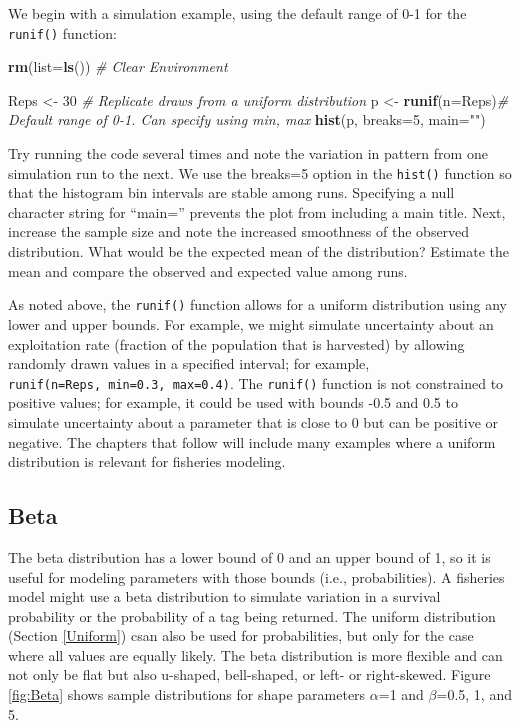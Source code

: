 \documentclass[
]{krantz}
\makeatletter
\newenvironment{Shaded}{\begin{snugshade}}{\end{snugshade}}
\newcommand{\AttributeTok}[1]{\textcolor[rgb]{0.27,0.27,0.27}{#1}}
\newcommand{\CommentTok}[1]{\textcolor[rgb]{0.37,0.37,0.37}{\textit{#1}}}
\newcommand{\DecValTok}[1]{\textcolor[rgb]{0.06,0.06,0.06}{#1}}
\newcommand{\FunctionTok}[1]{\textcolor[rgb]{0.27,0.27,0.27}{\textbf{#1}}}
\newcommand{\NormalTok}[1]{#1}
\newcommand{\OtherTok}[1]{\textcolor[rgb]{0.37,0.37,0.37}{#1}}
\newcommand{\StringTok}[1]{\textcolor[rgb]{0.5,0.5,0.5}{#1}}
\newenvironment{kframe}{%
\medskip{}
\setlength{\fboxsep}{.8em}
 \def\at@end@of@kframe{}%
 \ifinner\ifhmode%
  \def\at@end@of@kframe{\end{minipage}}%
  \begin{minipage}{\columnwidth}%
 \fi\fi%
 \def\FrameCommand##1{\hskip\@totalleftmargin \hskip-\fboxsep
 \colorbox{shadecolor}{##1}\hskip-\fboxsep
     \hskip-\linewidth \hskip-\@totalleftmargin \hskip\columnwidth}%
 \MakeFramed {\advance\hsize-\width
   \@totalleftmargin\z@ \linewidth\hsize
   \@setminipage}}%
 {\par\unskip\endMakeFramed%
 \at@end@of@kframe}
\renewenvironment{Shaded}{\begin{kframe}}{\end{kframe}}
\makeatother
\begin{document}
We begin with a simulation example, using the default range of 0-1 for the \texttt{runif()} function:

\begin{Shaded}
\begin{Highlighting}[]
\FunctionTok{rm}\NormalTok{(}\AttributeTok{list=}\FunctionTok{ls}\NormalTok{()) }\CommentTok{\# Clear Environment}

\NormalTok{Reps }\OtherTok{\textless{}{-}} \DecValTok{30} \CommentTok{\# Replicate draws from a uniform distribution}
\NormalTok{p }\OtherTok{\textless{}{-}} \FunctionTok{runif}\NormalTok{(}\AttributeTok{n=}\NormalTok{Reps)}\CommentTok{\# Default range of 0{-}1. Can specify using min, max}
\FunctionTok{hist}\NormalTok{(p, }\AttributeTok{breaks=}\DecValTok{5}\NormalTok{, }\AttributeTok{main=}\StringTok{""}\NormalTok{)}
\end{Highlighting}
\end{Shaded}

Try running the code several times and note the variation in pattern from one simulation run to the next. We use the breaks=5 option in the \texttt{hist()} function so that the histogram bin intervals are stable among runs. Specifying a null character string for ``main='' prevents the plot from including a main title. Next, increase the sample size and note the increased smoothness of the observed distribution. What would be the expected mean of the distribution? Estimate the mean and compare the observed and expected value among runs.

As noted above, the \texttt{runif()} function allows for a uniform distribution using any lower and upper bounds. For example, we might simulate uncertainty about an exploitation rate (fraction of the population that is harvested) by allowing randomly drawn values in a specified interval; for example, \texttt{runif(n=Reps,\ min=0.3,\ max=0.4)}. The \texttt{runif()} function is not constrained to positive values; for example, it could be used with bounds -0.5 and 0.5 to simulate uncertainty about a parameter that is close to 0 but can be positive or negative. The chapters that follow will include many examples where a uniform distribution is relevant for fisheries modeling.

\hypertarget{BetaDist}{%
\subsection{Beta}\label{BetaDist}}

The beta distribution has a lower bound of 0 and an upper bound of 1, so it is useful for modeling parameters with those bounds (i.e., probabilities). A fisheries model might use a beta distribution to simulate variation in a survival probability or the probability of a tag being returned. The uniform distribution (Section \ref{Uniform}) csan also be used for probabilities, but only for the case where all values are equally likely. The beta distribution is more flexible and can not only be flat but also u-shaped, bell-shaped, or left- or right-skewed. Figure \ref{fig:Beta} shows sample distributions for shape parameters \(\alpha\)=1 and \(\beta\)=0.5, 1, and 5.
\end{document}
